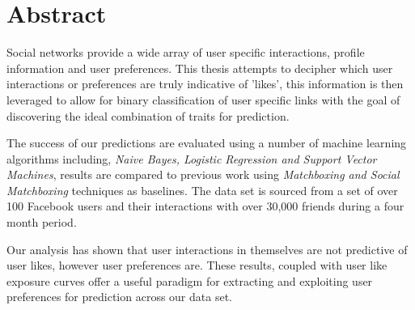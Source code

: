 
\chapter*{Abstract}
\label{cha:abstract}

Social networks provide a wide array of user specific interactions, profile information and user preferences.
This thesis attempts to decipher which user interactions or preferences are truly indicative of 'likes', this 
information is then leveraged to allow for binary classification of user specific links with the goal of discovering the 
ideal combination of traits for prediction.

The success of our predictions are evaluated using a number of machine learning algorithms including, 
\emph{Naive Bayes, Logistic Regression and Support Vector Machines}, results are compared to previous work 
using \emph{Matchboxing and Social Matchboxing} techniques as baselines. The data set is sourced from a set of over 100 Facebook 
users and their interactions with over 30,000 friends during a four month period.

Our analysis has shown that user interactions in themselves are not predictive of user likes, however user preferences are. These 
results, coupled with user like exposure curves offer a useful paradigm for extracting and exploiting user preferences for prediction 
across our data set.

